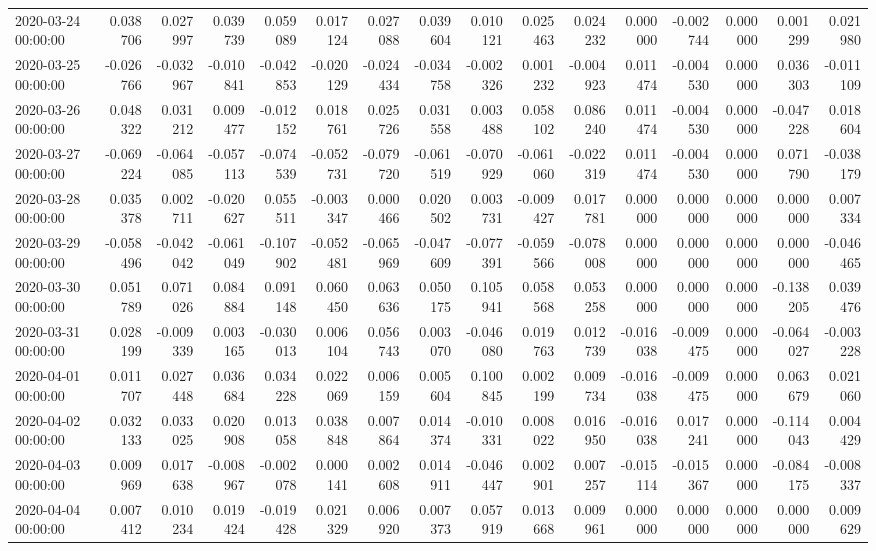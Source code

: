 \begin{tabular}{lrrrrrrrrrrrrrrr}
2020-03-24 00:00:00 & 0.038706 & 0.027997 & 0.039739 & 0.059089 & 0.017124 & 0.027088 & 0.039604 & 0.010121 & 0.025463 & 0.024232 & 0.000000 & -0.002744 & 0.000000 & 0.001299 & 0.021980 \\
2020-03-25 00:00:00 & -0.026766 & -0.032967 & -0.010841 & -0.042853 & -0.020129 & -0.024434 & -0.034758 & -0.002326 & 0.001232 & -0.004923 & 0.011474 & -0.004530 & 0.000000 & 0.036303 & -0.011109 \\
2020-03-26 00:00:00 & 0.048322 & 0.031212 & 0.009477 & -0.012152 & 0.018761 & 0.025726 & 0.031558 & 0.003488 & 0.058102 & 0.086240 & 0.011474 & -0.004530 & 0.000000 & -0.047228 & 0.018604 \\
2020-03-27 00:00:00 & -0.069224 & -0.064085 & -0.057113 & -0.074539 & -0.052731 & -0.079720 & -0.061519 & -0.070929 & -0.061060 & -0.022319 & 0.011474 & -0.004530 & 0.000000 & 0.071790 & -0.038179 \\
2020-03-28 00:00:00 & 0.035378 & 0.002711 & -0.020627 & 0.055511 & -0.003347 & 0.000466 & 0.020502 & 0.003731 & -0.009427 & 0.017781 & 0.000000 & 0.000000 & 0.000000 & 0.000000 & 0.007334 \\
2020-03-29 00:00:00 & -0.058496 & -0.042042 & -0.061049 & -0.107902 & -0.052481 & -0.065969 & -0.047609 & -0.077391 & -0.059566 & -0.078008 & 0.000000 & 0.000000 & 0.000000 & 0.000000 & -0.046465 \\
2020-03-30 00:00:00 & 0.051789 & 0.071026 & 0.084884 & 0.091148 & 0.060450 & 0.063636 & 0.050175 & 0.105941 & 0.058568 & 0.053258 & 0.000000 & 0.000000 & 0.000000 & -0.138205 & 0.039476 \\
2020-03-31 00:00:00 & 0.028199 & -0.009339 & 0.003165 & -0.030013 & 0.006104 & 0.056743 & 0.003070 & -0.046080 & 0.019763 & 0.012739 & -0.016038 & -0.009475 & 0.000000 & -0.064027 & -0.003228 \\
2020-04-01 00:00:00 & 0.011707 & 0.027448 & 0.036684 & 0.034228 & 0.022069 & 0.006159 & 0.005604 & 0.100845 & 0.002199 & 0.009734 & -0.016038 & -0.009475 & 0.000000 & 0.063679 & 0.021060 \\
2020-04-02 00:00:00 & 0.032133 & 0.033025 & 0.020908 & 0.013058 & 0.038848 & 0.007864 & 0.014374 & -0.010331 & 0.008022 & 0.016950 & -0.016038 & 0.017241 & 0.000000 & -0.114043 & 0.004429 \\
2020-04-03 00:00:00 & 0.009969 & 0.017638 & -0.008967 & -0.002078 & 0.000141 & 0.002608 & 0.014911 & -0.046447 & 0.002901 & 0.007257 & -0.015114 & -0.015367 & 0.000000 & -0.084175 & -0.008337 \\
2020-04-04 00:00:00 & 0.007412 & 0.010234 & 0.019424 & -0.019428 & 0.021329 & 0.006920 & 0.007373 & 0.057919 & 0.013668 & 0.009961 & 0.000000 & 0.000000 & 0.000000 & 0.000000 & 0.009629 \\

\end{tabular}
